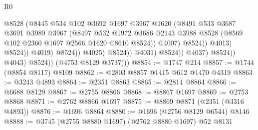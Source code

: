 \begin{lexlean}{R0}
\begin{coremodule}
                                              @8528
                                              (@8445
                                                @534
                                                @102
                                                @3692
                                                @1697
                                                @3967
                                                @1620
                                                (@8491
                                                  @533
                                                  @3687
                                                  @3691
                                                  @3989
                                                  @3967
                                                  (@8497
                                                    @532
                                                    @1972
                                                    @3686
                                                    @2143
                                                    @3988
                                                    @8528
                                                    (@8569
                                                      @102
                                                      @2360
                                                      @1697
                                                      @2566
                                                      @1620
                                                      @8610
                                                      @8524))
                                                  @4007)
                                                @8524))
                                            @4013)
                                          @8524))
                                      @4019)
                                    @8524))
                                @4025)
                              @8524))
                          @4031)
                        @8524))
                    @4037)
                  @8524))
              @4043)
            @8524))
        (@4753 @8129 @3737)))
@8854 := @1747 @214
@8857 := @1744 (@8854 @8117) @8109
@8862 := @2803 @8857 @1415 @612 @1470 @4319
@8863 := @3243 @4893
@8864 := @2351 @8863
@8865 := @2814 @8864
@8866 := @6688 @8129
@8867 := @2755 @8866
@8868 := @8867 @1697
@8869 := @2753 @8868
@8871 := @2762 @8866 @1697
@8875 := @8869 @8871 (@2351 (@3316 @4893))
@8876 := @1696 @8864
@8880 := @1696 (@2756 @8129 @6544) @8146
@8888 := @3745 (@2755 @8880 @1697) (@2762 @8880 @1697) @52 @8131

\end{coremodule}
\end{lexlean}
